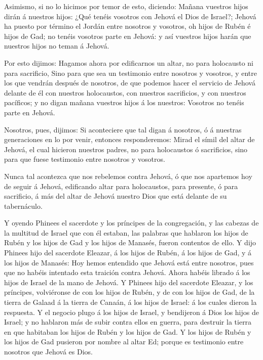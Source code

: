  Asimismo, si no lo hicimos por temor de esto, diciendo:
Mañana vuestros hijos dirán á nuestros hijos: ¿Qué tenéis vosotros con
Jehová el Dios de Israel?;  Jehová ha puesto por término el
Jordán entre nosotros y vosotros, oh hijos de Rubén é hijos de Gad; no
tenéis vosotros parte en Jehová: y así vuestros hijos harán que nuestros
hijos no teman á Jehová.

 Por esto dijimos: Hagamos ahora por edificarnos un altar,
no para holocausto ni para sacrificio,  Sino para que sea
un testimonio entre nosotros y vosotros, y entre los que vendrán después
de nosotros, de que podemos hacer el servicio de Jehová delante de él
con nuestros holocaustos, con nuestros sacrificios, y con nuestros
pacíficos; y no digan mañana vuestros hijos á los nuestros: Vosotros no
tenéis parte en Jehová.

 Nosotros, pues, dijimos: Si aconteciere que tal digan á
nosotros, ó á nuestras generaciones en lo por venir, entonces
responderemos: Mirad el símil del altar de Jehová, el cual hicieron
nuestros padres, no para holocaustos ó sacrificios, sino para que fuese
testimonio entre nosotros y vosotros.

 Nunca tal acontezca que nos rebelemos contra Jehová, ó que
nos apartemos hoy de seguir á Jehová, edificando altar para holocaustos,
para presente, ó para sacrificio, á más del altar de Jehová nuestro Dios
que está delante de su tabernáculo.

 Y oyendo Phinees el sacerdote y los príncipes de la
congregación, y las cabezas de la multitud de Israel que con él estaban,
las palabras que hablaron los hijos de Rubén y los hijos de Gad y los
hijos de Manasés, fueron contentos de ello.  Y dijo Phinees
hijo del sacerdote Eleazar, á los hijos de Rubén, á los hijos de Gad, y
á los hijos de Manasés: Hoy hemos entendido que Jehová está entre
nosotros, pues que no habéis intentado esta traición contra Jehová.
Ahora habéis librado á los hijos de Israel de la mano de Jehová.
 Y Phinees hijo del sacerdote Eleazar, y los príncipes,
volviéronse de con los hijos de Rubén, y de con los hijos de Gad, de la
tierra de Galaad á la tierra de Canaán, á los hijos de Israel: á los
cuales dieron la respuesta.  Y el negocio plugo á los hijos
de Israel, y bendijeron á Dios los hijos de Israel; y no hablaron más de
subir contra ellos en guerra, para destruir la tierra en que habitaban
los hijos de Rubén y los hijos de Gad.  Y los hijos de
Rubén y los hijos de Gad pusieron por nombre al altar Ed; porque es
testimonio entre nosotros que Jehová es Dios.

